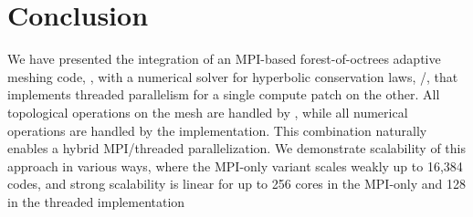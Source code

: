 

\section{Conclusion}

We have presented the integration of an MPI-based forest-of-octrees adaptive
meshing code, \pforest, with a numerical solver for hyperbolic
conservation laws, \clawpack/\manyclaw,
that implements threaded parallelism for a single compute patch
on the other.  All topological operations on the mesh are handled by \pforest,
while all numerical operations are handled by the \clawpack implementation.
This combination naturally enables a hybrid MPI/threaded parallelization.
We demonstrate scalability of this approach in various ways, where the MPI-only variant
scales weakly up to 16,384 codes, and strong scalability is linear for up to 256 cores
in the MPI-only and 128 in the threaded implementation
